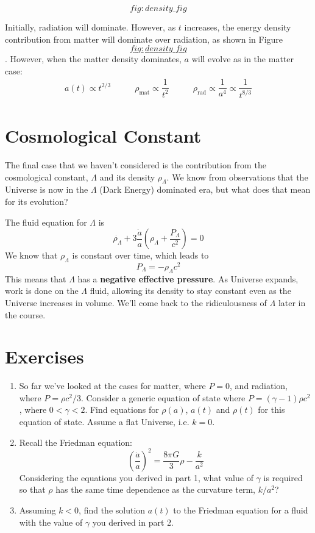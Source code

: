 \documentclass[]{book}
\begin{document}
\protect\hypertarget{fig:density_fig}{}{\[fig:density\_fig\]}

Initially, radiation will dominate. However, as \(t\) increases, the
energy density contribution from matter will dominate over radiation, as
shown in
Figure~\protect\hyperlink{fig:density_fig}{\[fig:density\_fig\]}. However, when the matter density
dominates, \(a\) will evolve as in the matter case: \[\begin{array}{lcr}
    a(t) \propto t^{2/3} & \qquad
    \rho_{\text{mat}} \propto \dfrac{1}{t^2} & \qquad
    \rho_{\text{rad}} \propto \dfrac{1}{a^4} \propto \dfrac{1}{t^{8/3}}
\end{array}\]

\hypertarget{sec:dark_energy_1}{%
\section{Cosmological Constant}\label{sec:dark_energy_1}}

The final case that we haven't considered is the contribution from the
cosmological constant, \(\Lambda\) and its density \(\rho_{\Lambda}\). We
know from observations that the Universe is now in the \(\Lambda\) (Dark
Energy) dominated era, but what does that mean for its evolution?

The fluid equation for \(\Lambda\) is
\[\dot{\rho_{\Lambda}} + 3\frac{\dot{a}}{a} \left(\rho_{\Lambda} + \dfrac{P_{\Lambda}}{c^2}\right) = 0\]
We know that \(\rho_{\Lambda}\) is constant over time, which leads to
\[P_\Lambda = -\rho_{\Lambda}c^2\] This means that \(\Lambda\) has a
\textbf{negative effective pressure}. As Universe expands, work is done on
the \(\Lambda\) fluid, allowing its density to stay constant even as the
Universe increases in volume. We'll come back to the ridiculousness of
\(\Lambda\) later in the course.

\hypertarget{sec:composition_ex}{%
\section{Exercises}\label{sec:composition_ex}}

\begin{enumerate}
\def\labelenumi{\arabic{enumi}.}
\item
  So far we've looked at the cases for matter, where \(P = 0\), and
  radiation, where \(P = \rho c^2 / 3\). Consider a generic equation of
  state where \(P = (\gamma - 1) \rho c^2\), where \(0 < \gamma < 2\).
  Find equations for \(\rho(a)\), \(a(t)\) and \(\rho(t)\) for this equation
  of state. Assume a flat Universe, i.e. \(k=0\).
\item
  Recall the Friedman equation:
  \[\left(\dfrac{\dot{a}}{a}\right)^2 = \dfrac{8\pi G}{3}\rho - \dfrac{k}{a^2}\]
  Considering the equations you derived in part 1, what value of
  \(\gamma\) is required so that \(\rho\) has the same time dependence as
  the curvature term, \(k/a^2\)?
\item
  Assuming \(k<0\), find the solution \(a(t)\) to the Friedman equation
  for a fluid with the value of \(\gamma\) you derived in part 2.
\end{enumerate}


\end{document}
